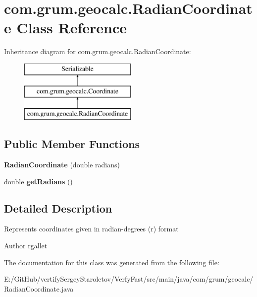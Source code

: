 \hypertarget{classcom_1_1grum_1_1geocalc_1_1_radian_coordinate}{}\section{com.\+grum.\+geocalc.\+Radian\+Coordinate Class Reference}
\label{classcom_1_1grum_1_1geocalc_1_1_radian_coordinate}
Inheritance diagram for com.\+grum.\+geocalc.\+Radian\+Coordinate\+:\begin{figure}[H]
\begin{center}
\leavevmode
\includegraphics[height=3.000000cm]{classcom_1_1grum_1_1geocalc_1_1_radian_coordinate}
\end{center}
\end{figure}
\subsection*{Public Member Functions}
\begin{DoxyCompactItemize}
\item 
\mbox{\label{classcom_1_1grum_1_1geocalc_1_1_radian_coordinate_aeef1a0bb8e19cfd88443567f2a1cabf8}} 
{\bfseries Radian\+Coordinate} (double radians)
\item 
\mbox{\label{classcom_1_1grum_1_1geocalc_1_1_radian_coordinate_a031f41c3543933b226c01dc3070fd7a2}} 
double {\bfseries get\+Radians} ()
\end{DoxyCompactItemize}


\subsection{Detailed Description}
Represents coordinates given in radian-\/degrees (r) format

\begin{DoxyAuthor}{Author}
rgallet 
\end{DoxyAuthor}


The documentation for this class was generated from the following file\+:\begin{DoxyCompactItemize}
\item 
E\+:/\+Git\+Hub/vertify\+Sergey\+Staroletov/\+Verfy\+Fast/src/main/java/com/grum/geocalc/Radian\+Coordinate.\+java\end{DoxyCompactItemize}
